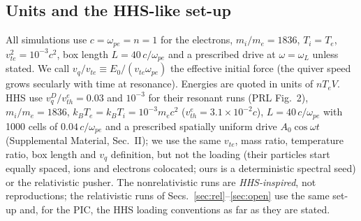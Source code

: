 \documentclass[aps,pre,reprint,floatfix,amsmath,amssymb,nofootinbib,superscriptaddress]{revtex4-2}
\newcommand{\vq}{v_q/v_{te}}
\newcommand{\nTV}{nT_eV}
\newcommand{\wpe}{\omega_{pe}}
\begin{document}
\subsection{Units and the HHS-like set-up}\label{sec:units}
All simulations use $c=\wpe=n=1$ for the electrons, $m_i/m_e=1836$, $T_i=T_e$, $v_{te}^2=10^{-3}c^2$, box length $L=40\,c/\wpe$ and a prescribed drive at $\omega=\omega_L$ unless stated. We call $\vq\equiv E_0/(v_{te}\wpe)$ the effective initial force (the quiver speed grows secularly with time at resonance). Energies are quoted in units of $\nTV$. HHS use $v_q^D/v_{th}^e=0.03$ and $10^{-3}$ for their resonant runs (PRL Fig.~2), $m_i/m_e=1836$, $k_BT_e=k_BT_i=10^{-3}m_ec^2$ ($v_{th}^e=3.1\times10^{-2}c$), $L=40\,c/\wpe$ with 1000 cells of $0.04\,c/\wpe$ and a prescribed spatially uniform drive $A_0\cos\omega t$ (Supplemental Material, Sec.~II); we use the same $v_{te}$, mass ratio, temperature ratio, box length and $v_q$ definition, but not the loading (their particles start equally spaced, ions and electrons colocated; ours is a deterministic spectral seed) or the relativistic pusher. The nonrelativistic runs are \emph{HHS-inspired}, not reproductions; the relativistic runs of Secs.~\ref{sec:rel}--\ref{sec:open} use the same set-up and, for the PIC, the HHS loading conventions as far as they are stated.
\end{document}

